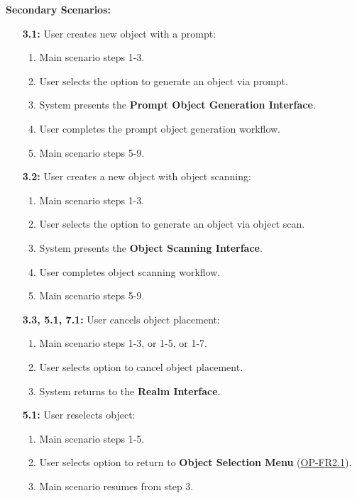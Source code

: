 \documentclass{article}
\begin{document}
\begin{enumerate}[label=\textbf{UC\arabic*}]
        \textbf{Secondary Scenarios:}
        \begin{itemize}
            \item[{\bf 3.1:}] User creates new object with a prompt:
            \begin{enumerate}[label=\textbf{\arabic*.}]
                \item Main scenario steps 1-3.
                \item User selects the option to generate an object via prompt.
                \item System presents the \textbf{Prompt Object Generation Interface}.
                \item User completes the prompt object generation workflow.
                \item Main scenario steps 5-9.
            \end{enumerate}
    
            \item[{\bf 3.2:}] User creates a new object with object scanning:
            \begin{enumerate}[label=\textbf{\arabic*.}]
                \item Main scenario steps 1-3.
                \item User selects the option to generate an object via object scan.
                \item System presents the \textbf{Object Scanning Interface}.
                \item User completes object scanning workflow.
                \item Main scenario steps 5-9.
            \end{enumerate}
    
            \item[{\bf 3.3, 5.1, 7.1:}] User cancels object placement:
            \begin{enumerate}[label=\textbf{\arabic*.}]
                \item Main scenario steps 1-3, or 1-5, or 1-7.
                \item User selects option to cancel object placement.
                \item System returns to the \textbf{Realm Interface}.
            \end{enumerate}
    
            \item[{\bf 5.1:}] User reselects object:
            \begin{enumerate}[label=\textbf{\arabic*.}]
                \item Main scenario steps 1-5.
                \item User selects option to return to \textbf{Object Selection Menu} (\hyperref[ssub:object_placement]{OP-FR2.1}).
                \item Main scenario resumes from step 3.
            \end{enumerate}
    

\end{itemize}
\end{enumerate}
\end{document}
